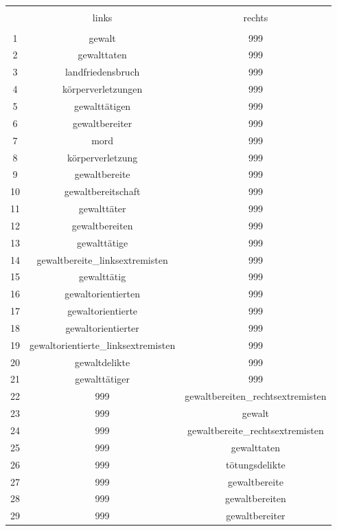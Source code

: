 
\begin{table}[!htbp] \centering 
  \caption{} 
  \label{} 
\begin{tabular}{@{\extracolsep{5pt}} ccc} 
\\[-1.8ex]\hline 
\hline \\[-1.8ex] 
 & links & rechts \\ 
\hline \\[-1.8ex] 
1 & gewalt & 999 \\ 
2 & gewalttaten & 999 \\ 
3 & landfriedensbruch & 999 \\ 
4 & körperverletzungen & 999 \\ 
5 & gewalttätigen & 999 \\ 
6 & gewaltbereiter & 999 \\ 
7 & mord & 999 \\ 
8 & körperverletzung & 999 \\ 
9 & gewaltbereite & 999 \\ 
10 & gewaltbereitschaft & 999 \\ 
11 & gewalttäter & 999 \\ 
12 & gewaltbereiten & 999 \\ 
13 & gewalttätige & 999 \\ 
14 & gewaltbereite\_linksextremisten & 999 \\ 
15 & gewalttätig & 999 \\ 
16 & gewaltorientierten & 999 \\ 
17 & gewaltorientierte & 999 \\ 
18 & gewaltorientierter & 999 \\ 
19 & gewaltorientierte\_linksextremisten & 999 \\ 
20 & gewaltdelikte & 999 \\ 
21 & gewalttätiger & 999 \\ 
22 & 999 & gewaltbereiten\_rechtsextremisten \\ 
23 & 999 & gewalt \\ 
24 & 999 & gewaltbereite\_rechtsextremisten \\ 
25 & 999 & gewalttaten \\ 
26 & 999 & tötungsdelikte \\ 
27 & 999 & gewaltbereite \\ 
28 & 999 & gewaltbereiten \\ 
29 & 999 & gewaltbereiter \\ 

\end{tabular}
\end{table}
